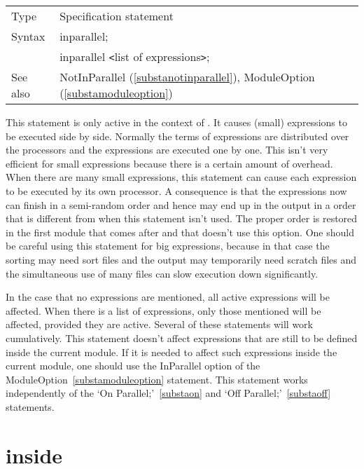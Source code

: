 \noindent \begin{tabular}{ll}
Type & Specification statement\\
Syntax & inparallel; \\
       & inparallel {\tt<}list of expressions{\tt>};
\\ See also & NotInParallel (\ref{substanotinparallel}), 
     ModuleOption (\ref{substamoduleoption})
\end{tabular} \vspace{4mm}

\noindent This statement is only active in the context of 
\TFORM{}. It causes 
(small) expressions to be executed side by side. Normally the terms of 
expressions are distributed over the processors and the expressions are 
executed one by one. This isn't very efficient for small expressions 
because there is a certain amount of overhead. When there are many small 
expressions, this statement can cause each expression to be executed by its 
own processor. A consequence is that the expressions now can finish in a 
semi-random order and hence may end up in the output in a order that is 
different from when this statement isn't used. The proper order is restored 
in the first module that comes after and that doesn't use this option. One 
should be careful using this statement for big expressions, because in that 
case the sorting may need sort files and the output may temporarily need 
scratch files and the simultaneous use of many files can slow execution 
down significantly.

\noindent In the case that no expressions are mentioned, all active 
expressions will be affected. When there is a list of expressions, only 
those mentioned will be affected, provided they are active. Several of 
these statements will work cumulatively. This statement doesn't affect 
expressions that are still to be defined inside the current module. If it 
is needed to affect such expressions inside the current module, one should 
use the InParallel option of the 
ModuleOption~\ref{substamoduleoption} 
statement. This statement works independently of the `On 
Parallel;'~\ref{substaon} and `Off Parallel;'~\ref{substaoff} statements.
\vspace{10mm}


\section{inside}
\label{substainside}


